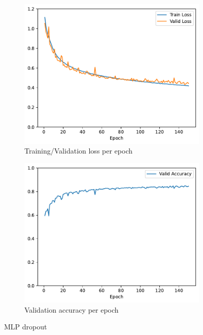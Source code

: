 \documentclass[11pt]{article}
\begin{document}
\begin{figure}[h!]
\centering
\begin{subfigure}{.5\textwidth}
  \centering
  \includegraphics[width=.9\linewidth]{plots/mlp-training-loss-batch-256-lr-0.1-epochs-150-hidden-200-dropout-0.2-l2-0-layers-1-act-relu-opt-sgd.pdf}
  \caption{Training/Validation loss per epoch}
\end{subfigure}%
\begin{subfigure}{.5\textwidth}
  \centering
  \includegraphics[width=.9\linewidth]{plots/mlp-validation-accuracy-batch-256-lr-0.1-epochs-150-hidden-200-dropout-0.2-l2-0-layers-1-act-relu-opt-sgd}
  \caption{Validation accuracy per epoch}
\end{subfigure}
\caption{MLP dropout}
\label{fig:MLP_dropout}
\end{figure}
\end{document}

